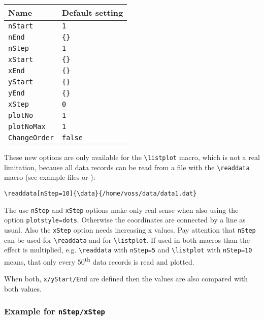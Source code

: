 \begin{center}
\begin{tabular}{l|l}
Name & Default setting\\\hline
\verb|nStart| &  \verb|1|\\
\verb|nEnd|   &  \verb|{}|\\
\verb|nStep|  &  \verb|1|\\
\verb|xStart| &  \verb|{}|\\
\verb|xEnd|   &  \verb|{}|\\
\verb|yStart| &  \verb|{}|\\
\verb|yEnd|   &  \verb|{}|\\
\verb|xStep|  &  \verb|0|\\
\verb|plotNo|  &  \verb|1|\\
\verb|plotNoMax|  &  \verb|1|\\
\verb|ChangeOrder|  &  \verb|false|
\end{tabular}
\end{center}

These new options are only available
for the \verb|\listplot| macro, which is not a real limitation, because all data records can be read
from a file with the \verb|\readdata| macro (see example files or \cite{dtk02.2:jackson.voss:plot-funktionen}):
\begin{verbatim}
\readdata[nStep=10]{\data}{/home/voss/data/data1.dat}
\end{verbatim}

The use \verb|nStep| and \verb|xStep| options make only real sense when also using the
option \verb|plotstyle=dots|. Otherwise the coordinates are connected by a line as usual. Also the \verb|xStep| option needs increasing x values.
Pay attention that \verb+nStep+ can be used for \verb+\readdata+ and for \verb+\listplot+. If used
in both macros than the effect is multiplied, e.g. \verb+\readdata+ with \verb+nStep=5+ and
\verb+\listplot+ with \verb+nStep=10+ means, that only every 50\textsuperscript{th} data records
is read and plotted.

When both, \verb|x/yStart/End| are defined then the values are also compared with
both values.

\subsubsection{Example for \texttt{nStep/xStep}}

